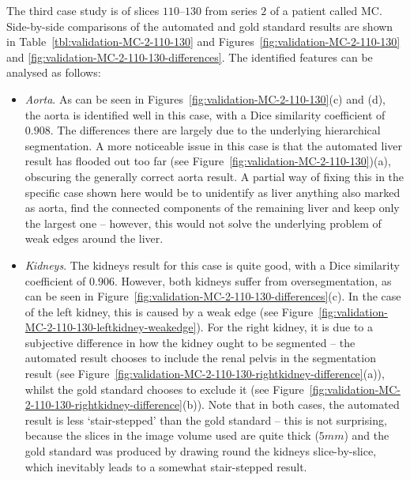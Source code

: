 The third case study is of slices $110$--$130$ from series $2$ of a patient called MC. Side-by-side comparisons of the automated and gold standard results are shown in Table~\ref{tbl:validation-MC-2-110-130} and Figures~\ref{fig:validation-MC-2-110-130} and \ref{fig:validation-MC-2-110-130-differences}. The identified features can be analysed as follows:
%
\begin{itemize}

\item \emph{Aorta}. As can be seen in Figures~\ref{fig:validation-MC-2-110-130}(c) and (d), the aorta is identified well in this case, with a Dice similarity coefficient of $0.908$. The differences there are largely due to the underlying hierarchical segmentation. A more noticeable issue in this case is that the automated liver result has flooded out too far (see Figure~\ref{fig:validation-MC-2-110-130})(a), obscuring the generally correct aorta result. A partial way of fixing this in the specific case shown here would be to unidentify as liver anything also marked as aorta, find the connected components of the remaining liver and keep only the largest one -- however, this would not solve the underlying problem of weak edges around the liver.

\item \emph{Kidneys}. The kidneys result for this case is quite good, with a Dice similarity coefficient of $0.906$. However, both kidneys suffer from oversegmentation, as can be seen in Figure~\ref{fig:validation-MC-2-110-130-differences}(c). In the case of the left kidney, this is caused by a weak edge (see Figure~\ref{fig:validation-MC-2-110-130-leftkidney-weakedge}). For the right kidney, it is due to a subjective difference in how the kidney ought to be segmented -- the automated result chooses to include the renal pelvis in the segmentation result (see Figure~\ref{fig:validation-MC-2-110-130-rightkidney-difference}(a)), whilst the gold standard chooses to exclude it (see Figure~\ref{fig:validation-MC-2-110-130-rightkidney-difference}(b)). Note that in both cases, the automated result is less `stair-stepped' than the gold standard -- this is not surprising, because the slices in the image volume used are quite thick ($5\mathit{mm}$) and the gold standard was produced by drawing round the kidneys slice-by-slice, which inevitably leads to a somewhat stair-stepped result.


\end{itemize}
